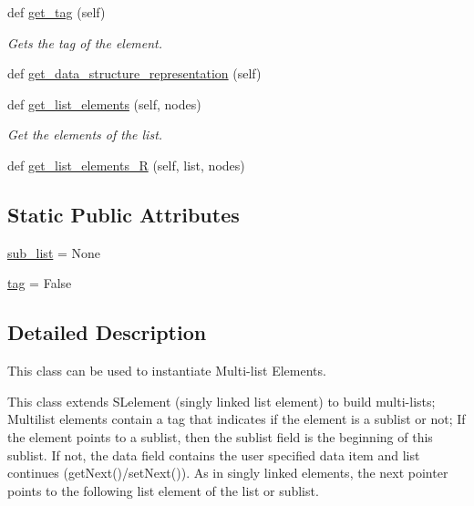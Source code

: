 \begin{DoxyCompactItemize}
def \hyperlink{class_bridges_1_1ml__element_1_1_m_lelement_a4657bdb7c765e5c0dac5e14fb6a61153}{get\+\_\+tag} (self)
\begin{DoxyCompactList}\small\item\em Gets the tag of the element. \end{DoxyCompactList}\item 
def \hyperlink{class_bridges_1_1ml__element_1_1_m_lelement_a3a511e7ec143ddc3a0ee5394dac76a0d}{get\+\_\+data\+\_\+structure\+\_\+representation} (self)
\item 
def \hyperlink{class_bridges_1_1ml__element_1_1_m_lelement_a6919e148ee1e2cf867f30240bf890ee7}{get\+\_\+list\+\_\+elements} (self, nodes)
\begin{DoxyCompactList}\small\item\em Get the elements of the list. \end{DoxyCompactList}\item 
def \hyperlink{class_bridges_1_1ml__element_1_1_m_lelement_a0bceedd612ad350144d1bc2cd0634291}{get\+\_\+list\+\_\+elements\+\_\+\+R} (self, list, nodes)
\end{DoxyCompactItemize}
\subsection*{Static Public Attributes}
\begin{DoxyCompactItemize}
\item 
\hyperlink{class_bridges_1_1ml__element_1_1_m_lelement_a08b50da0d31100920122df7df01c8abc}{sub\+\_\+list} = None
\item 
\hyperlink{class_bridges_1_1ml__element_1_1_m_lelement_aa9891ba8d6172b9ed65981f26036c213}{tag} = False
\end{DoxyCompactItemize}


\subsection{Detailed Description}
This class can be used to instantiate Multi-\/list Elements. 

This class extends S\+Lelement (singly linked list element) to build multi-\/lists; Multilist elements contain a tag that indicates if the element is a sublist or not; If the element points to a sublist, then the sublist field is the beginning of this sublist. If not, the data field contains the user specified data item and list continues (get\+Next()/set\+Next()). As in singly linked elements, the next pointer points to the following list element of the list or sublist.

